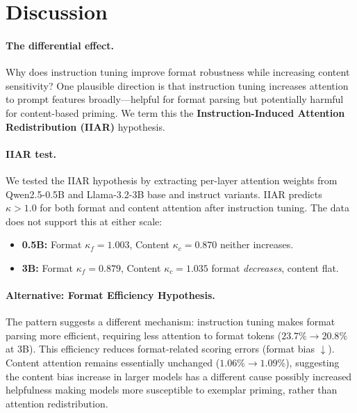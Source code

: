 \documentclass[11pt,twocolumn]{article}
\begin{document}
\section{Discussion}

\paragraph{The differential effect.}
Why does instruction tuning improve format robustness while increasing content sensitivity? One plausible direction is that instruction tuning increases attention to prompt features broadly---helpful for format parsing but potentially harmful for content-based priming. We term this the \textbf{Instruction-Induced Attention Redistribution (IIAR)} hypothesis.

\paragraph{IIAR test.} We tested the IIAR hypothesis by extracting per-layer attention weights from Qwen2.5-0.5B and Llama-3.2-3B base and instruct variants. IIAR predicts $\kappa > 1.0$ for both format and content attention after instruction tuning. The data does not support this at either scale:

\begin{itemize}
    \item \textbf{0.5B:} Format $\kappa_f = 1.003$, Content $\kappa_c = 0.870$  neither increases.
    \item \textbf{3B:} Format $\kappa_f = 0.879$, Content $\kappa_c = 1.035$  format \emph{decreases}, content flat.
\end{itemize}

\paragraph{Alternative: Format Efficiency Hypothesis.} The pattern suggests a different mechanism: instruction tuning makes format parsing more efficient, requiring less attention to format tokens ($23.7\% \to 20.8\%$ at 3B). This efficiency reduces format-related scoring errors (format bias $\downarrow$). Content attention remains essentially unchanged ($1.06\% \to 1.09\%$), suggesting the content bias increase in larger models has a different cause  possibly increased helpfulness making models more susceptible to exemplar priming, rather than attention redistribution.
\end{document}

